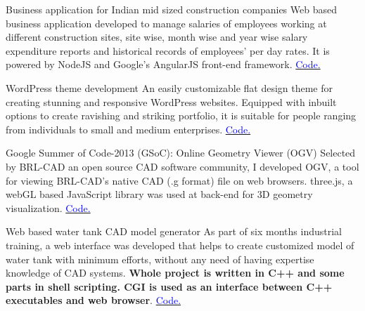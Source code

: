     {Business application for Indian mid sized construction companies}
    {}
    {}
    {}
    {Web based business application developed to manage salaries of employees working at different construction sites, site wise, month wise and year wise salary expenditure reports and historical records of employees' per day rates. It is powered by NodeJS and Google's AngularJS front-end framework.
        \hfill
        \href{https://bitbucket.org/harman052/gh/src/7388707bdb1138a6a4abc784bd5c6a4961a6d7f5/?at=new}{\textcolor{blue}{\scriptsize Code.}}
    }
    \vspace*{0.2\baselineskip}


    {WordPress theme development}
    {}
    {}
    {}
    {An easily customizable flat design theme for creating stunning and responsive WordPress websites. Equipped with inbuilt options to create ravishing and striking portfolio, it is suitable for people ranging from individuals to small and medium enterprises. 
        \hfill
        \href{https://bitbucket.org/harman052/gh/src/7388707bdb1138a6a4abc784bd5c6a4961a6d7f5/?at=new}{\textcolor{blue}{\scriptsize Code.}}
    }
    \vspace*{0.2\baselineskip}


    {Google Summer of Code-2013 (GSoC): Online Geometry Viewer (OGV)}
    {}
    {}
    {}
    {Selected by BRL-CAD an open source CAD software community, I developed OGV, a tool for viewing BRL-CAD's native CAD (.g format) file on web browsers. three.js, a webGL based JavaScript library was used at back-end for 3D geometry visualization.
        \hfill
        \href{https://goo.gl/xFLZUK}{\textcolor{blue}{\scriptsize Code.}}
    }
    \vspace*{0.2\baselineskip}


    {Web based water tank CAD model generator}
    {}
    {}
    {}
    {As part of six months industrial training, a web interface was developed that helps to create customized model of water tank with minimum efforts, without any need of having expertise knowledge of CAD systems. \textbf{Whole project is written in C++ and some parts in shell scripting. CGI is used as an interface between C++ executables and web browser}.
            \hfill
        \href{https://goo.gl/eRhCgg}{\textcolor{blue}{\scriptsize Code.}}
    }
    \vspace*{0.2\baselineskip}
